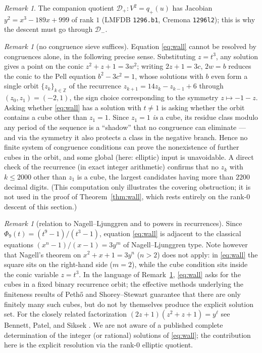 \documentclass[11pt]{article}
\theoremstyle{remark}
\newtheorem{remark}[theorem]{Remark}
\newcommand{\Z}{\mathbb{Z}}
\begin{document}
\begin{remark}
The companion quotient $\mathcal{D}_+:V^2=q_+(u)$ has Jacobian $y^2=x^3-189x+999$ of rank $1$ (LMFDB \texttt{1296.b1}, Cremona \texttt{1296l2}); this is why the descent must go through $\mathcal{D}_-$.
\end{remark}

\begin{remark}[no congruence sieve suffices]\label{rem:covering}
Equation \eqref{eq:wall} cannot be resolved by congruences alone, in the following precise sense. Substituting $z=t^3$, any solution gives a point on the conic $z^2+z+1=3w^2$; writing $2z+1=3c$, $2w=b$ reduces the conic to the Pell equation $b^2-3c^2=1$, whose solutions with $b$ even form a single orbit $\{z_k\}_{k\in\Z}$ of the recurrence $z_{k+1}=14z_k-z_{k-1}+6$ through $(z_0,z_1)=(-2,1)$, the sign choice corresponding to the symmetry $z\mapsto-1-z$. Asking whether \eqref{eq:wall} has a solution with $t\neq1$ is asking whether the orbit contains a cube other than $z_1=1$. Since $z_1=1$ \emph{is} a cube, its residue class modulo any period of the sequence is a ``shadow'' that no congruence can eliminate --- and via the symmetry it also protects a class in the negative branch. Hence no finite system of congruence conditions can prove the nonexistence of further cubes in the orbit, and some global (here: elliptic) input is unavoidable. A direct check of the recurrence (in exact integer arithmetic) confirms that no $z_k$ with $k\le2000$ other than $z_1$ is a cube, the largest candidates having more than $2200$ decimal digits. (This computation only illustrates the covering obstruction; it is not used in the proof of Theorem~\ref{thm:wall}, which rests entirely on the rank-$0$ descent of this section.)
\end{remark}

\begin{remark}[relation to Nagell--Ljunggren and to powers in recurrences]
Since $\Phi_9(t)=(t^9-1)/(t^3-1)$, equation \eqref{eq:wall} is adjacent to the classical equations $(x^n-1)/(x-1)=3y^m$ of Nagell--Ljunggren type. Note however that Nagell's theorem on $x^2+x+1=3y^n$ ($n>2$) does not apply: in \eqref{eq:wall} the square sits on the right-hand side ($m=2$), while the cube condition sits inside the conic variable $z=t^3$. In the language of Remark~\ref{rem:covering}, \eqref{eq:wall} asks for the cubes in a fixed binary recurrence orbit; the effective methods underlying the finiteness results of Peth\H{o} \cite{Petho} and Shorey--Stewart \cite{ShoreyStewart} guarantee that there are only finitely many such cubes, but do not by themselves produce the explicit solution set. For the closely related factorization $(2z+1)(z^2+z+1)=y^\ell$ see Bennett, Patel, and Siksek \cite{BPS}. We are not aware of a published complete determination of the integer (or rational) solutions of \eqref{eq:wall}; the contribution here is the explicit resolution via the rank-$0$ elliptic quotient.
\end{remark}
\end{document}
